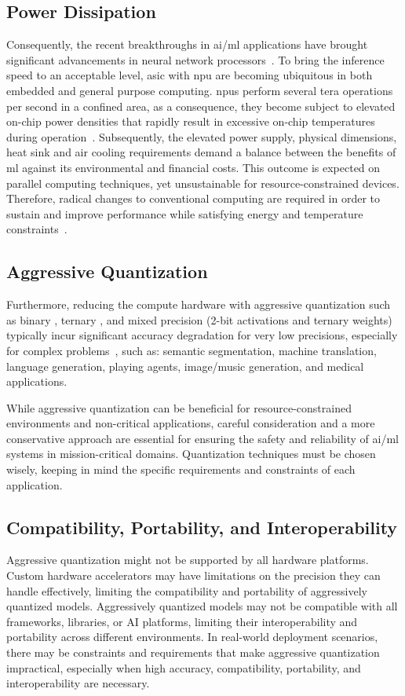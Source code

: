 \subsection{Power Dissipation}
Consequently, the recent breakthroughs in \gls{ai}/\gls{ml} applications have brought significant advancements in neural network processors~\cite{jouppi2017datacenter}. To bring the inference speed to an acceptable level, \gls{asic} with \gls{npu} are becoming ubiquitous in both embedded and general purpose computing. \glspl{npu} perform several tera operations per second in a confined area, as a consequence, they become subject to elevated on-chip power densities that rapidly result in excessive on-chip temperatures during operation~\cite{amrouch2020npu}. Subsequently, the elevated power supply, physical dimensions, heat sink and air cooling requirements demand a balance between the benefits of \gls{ml} against its environmental and financial costs. This outcome is expected on parallel computing techniques, yet unsustainable for resource-constrained devices.
Therefore, radical changes to conventional computing are required in order to sustain and improve performance while satisfying energy and temperature constraints~\cite{gillani2020exploiting}.

\subsection{Aggressive Quantization}
Furthermore, reducing the compute hardware with aggressive quantization such as binary \cite{courbariaux2015binaryconnect}, ternary \cite{lin2015neural}, and mixed precision (2-bit activations and ternary weights) \cite{colangelo2018exploration} typically incur significant accuracy degradation for very low precisions, especially for complex problems~\cite{faraone2019addnet}, such as: semantic segmentation, machine translation, language generation, playing agents, image/music generation, and medical applications.

While aggressive quantization can be beneficial for resource-constrained environments and non-critical applications, careful consideration and a more conservative approach are essential for ensuring the safety and reliability of \gls{ai}/\gls{ml} systems in mission-critical domains. Quantization techniques must be chosen wisely, keeping in mind the specific requirements and constraints of each application.

\subsection{Compatibility, Portability, and Interoperability}
Aggressive quantization might not be supported by all hardware platforms. Custom hardware accelerators may have limitations on the precision they can handle effectively, limiting the compatibility and portability of aggressively quantized models. Aggressively quantized models may not be compatible with all frameworks, libraries, or AI platforms, limiting their interoperability and portability across different environments. In real-world deployment scenarios, there may be constraints and requirements that make aggressive quantization impractical, especially when high accuracy, compatibility, portability, and interoperability are necessary.

